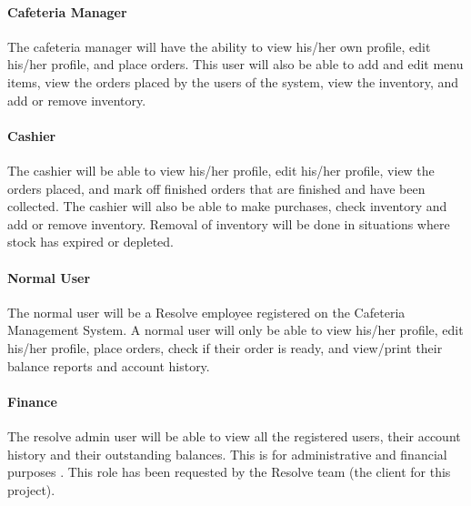 \documentclass[a4paper,12pt]{article}
\begin{document}
\paragraph{ Cafeteria Manager\\}
The cafeteria manager will have the ability to view his/her own profile, edit his/her profile, and place orders. This user will also be able to add and edit menu items, view the orders placed by the users of the system, view the inventory, and add or remove inventory. 

\paragraph{ Cashier\\}
The cashier will be able to view his/her profile, edit his/her profile, view the orders placed, and mark off finished orders that are finished and have been collected. The cashier will also be able to make purchases, check inventory and add or remove inventory. Removal of inventory will be done in situations where stock has expired or depleted.

\paragraph{ Normal User\\}
The normal user will be a Resolve employee registered on the Cafeteria Management System.  A normal user will only be able to view his/her profile, edit his/her profile, place orders, check if their order is ready, and view/print their balance reports and account history.

\paragraph{ Finance \\}
The resolve admin user will be able to view all the registered users, their account history and their outstanding balances. This is for administrative and financial purposes . This role has been requested by the Resolve team (the client for this project).

\end{document}
